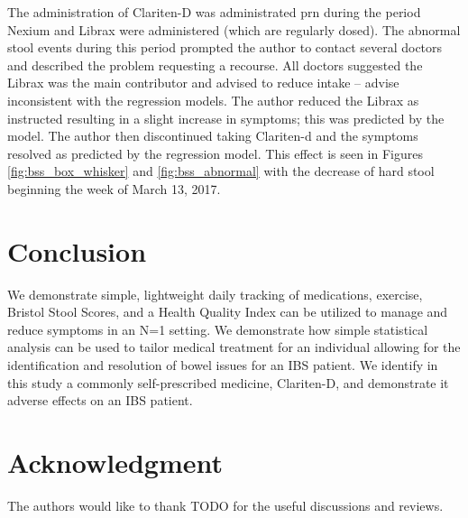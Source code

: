 \documentclass[conference]{IEEEtran}
\begin{document}
 The administration of Clariten-D was administrated prn during the period Nexium and Librax were administered (which are regularly dosed).  The abnormal stool events during this period prompted the author to contact several doctors and described the problem requesting a recourse.  All doctors suggested the Librax was the main contributor and advised to reduce intake -- advise inconsistent with the regression models.  The author reduced the Librax as instructed resulting in a slight increase in symptoms; this was predicted by the model. The author then discontinued taking Clariten-d and the symptoms resolved as predicted by the regression model. This effect is seen in Figures \ref{fig:bss_box_whisker} and \ref{fig:bss_abnormal} with the decrease of hard stool beginning the week of March 13, 2017.

\section*{Conclusion}
We demonstrate simple, lightweight daily tracking of medications, exercise, Bristol Stool Scores, and a Health Quality Index can be utilized to manage and reduce symptoms in an N=1 setting.  We demonstrate how simple statistical analysis can be used to tailor medical treatment for an individual allowing for the identification and resolution of bowel issues for an IBS patient.  We identify in this study a commonly self-prescribed medicine, Clariten-D, and demonstrate it adverse effects on an IBS patient.

\section*{Acknowledgment}
The authors would like to thank TODO for the useful discussions and reviews.






%
%
%




\end{document}
